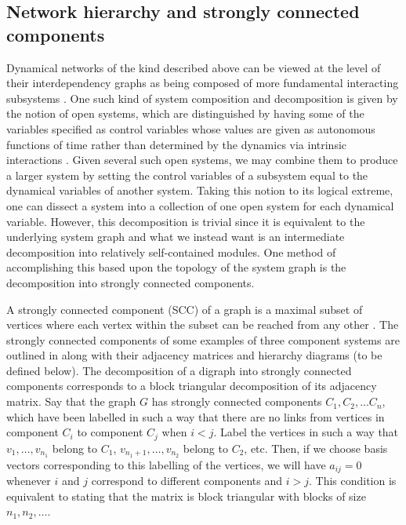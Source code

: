\subsection{Network hierarchy and strongly connected components}

Dynamical networks of the kind described above can be viewed at the level of their interdependency graphs as being composed of more fundamental interacting subsystems . One such kind of system composition and decomposition is given by the notion of open systems, which are distinguished by having some of the variables specified as control variables whose values are given as autonomous functions of time rather than determined by the dynamics via intrinsic interactions \cite{Vagner2014}.  Given several such open systems, we may combine them to produce a larger system by setting the control variables of a subsystem equal to the dynamical variables of another system.  Taking this notion to its logical extreme, one can dissect a system into a collection of one open system for each dynamical variable.  However, this decomposition is trivial since it is equivalent to the underlying system graph and what we instead want is an intermediate decomposition into relatively self-contained modules.  One method of accomplishing this based upon the topology of the system graph is the decomposition into strongly connected components.

A strongly connected component (SCC) of a graph is a maximal subset of vertices where each vertex within the subset can be reached from any other \cite{Cormen2009}. The strongly connected components of some examples of three component systems are outlined in  along with their adjacency matrices and hierarchy diagrams (to be defined below).
The decomposition of a digraph into strongly connected components corresponds to a block triangular decomposition of its adjacency matrix.  Say that the graph $G$ has strongly connected components $C_1, C_2, \ldots C_n$, which have been labelled in such a way that there are no links from vertices in component $C_i$ to component $C_j$ when $i < j$.  Label the vertices in such a way that $v_1, \ldots, v_{n_1}$ belong to $C_1$, $v_{n_1 + 1}, \ldots, v_{n_2}$ belong to $C_2$, etc.  Then, if we choose basis vectors corresponding to this labelling of the vertices, we will have $a_{ij} = 0$ whenever $i$ and $j$ correspond to different components and $i > j$.  This condition is equivalent to stating that the matrix is block triangular with blocks of size $n_1, n_2, \ldots$.

